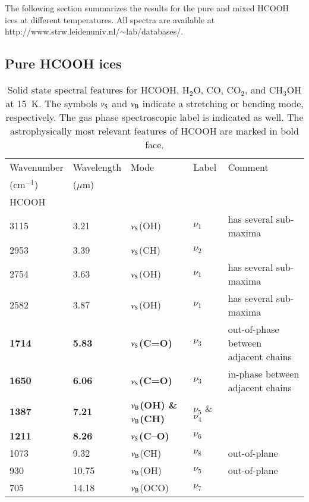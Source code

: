 \documentclass{aa}
\begin{document}
The following section summarizes the results for the pure and mixed
HCOOH ices at different temperatures. All spectra are available at
http://www.strw.leidenuniv.nl/$\sim$lab/databases/.

\subsection{Pure HCOOH ices}
\label{hcooh_res}

\begin{table*}
\caption{Solid state spectral features for HCOOH, H$_2$O, CO, CO$_2$,
and CH$_3$OH at 15~K. The symbols $\nu_{\rm S}$ and $\nu_{\rm B}$
indicate a stretching or bending mode, respectively. The gas phase
spectroscopic label is indicated as well. The astrophysically most
relevant features of HCOOH are marked in bold face.}\label{spectra}
\begin{center}
\begin{tabular}{lllll}
\hline
\hline
Wavenumber & Wavelength & Mode & Label & Comment\\
(cm$^{-1}$) & ($\mu$m) &  & & \\
\hline
\multicolumn{4}{l}{HCOOH} \\
\hline
3115 & \phantom{1}3.21 & $\nu_{\rm S}$(OH) & $\nu_1$ & has several sub-maxima\\
2953 & \phantom{1}3.39 & $\nu_{\rm S}$(CH) & $\nu_2$& \\
2754 & \phantom{1}3.63 & $\nu_{\rm S}$(OH) & $\nu_1$ & has several sub-maxima\\
2582 & \phantom{1}3.87 & $\nu_{\rm S}$(OH) & $\nu_1$ & has several sub-maxima\\
{\bf 1714} & {\bf\phantom{1}5.83} & {\bf $\nu_{\rm S}$(C=O)} & {\bf $\nu_3$} & out-of-phase between adjacent chains\\
{\bf 1650} & {\bf \phantom{1}6.06} & {\bf $\nu_{\rm S}$(C=O)}  & {\bf $\nu_3$} & in-phase between adjacent chains\\
{\bf 1387} & {\bf \phantom{1}7.21} & {\bf $\nu_{\rm B}$(OH) \& {\bf $\nu_{\rm B}$(CH)} } & {\bf $\nu_5$} \& {\bf $\nu_4$}\\
{\bf 1211} & {\bf \phantom{1}8.26} & {\bf $\nu_{\rm S}$(C--O)} & {\bf $\nu_6$} & \\
1073 & \phantom{1}9.32 & $\nu_{\rm B}$(CH) & $\nu_8$ & out-of-plane\\
\phantom{1}930  & 10.75 & $\nu_{\rm B}$(OH) & $\nu_5$ & out-of-plane\\
\phantom{1}705  & 14.18 & $\nu_{\rm B}$(OCO) & $\nu_7$\\

\end{tabular}
\end{center}
\end{table*}
\end{document}
